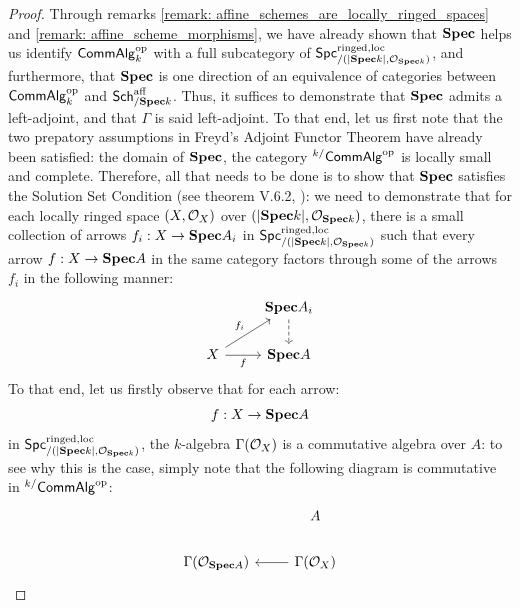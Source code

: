                     \begin{proof}
                        Through remarks \ref{remark: affine_schemes_are_locally_ringed_spaces} and \ref{remark: affine_scheme_morphisms}, we have already shown that $\Spec$ helps us identify $\Comm\Alg^{\op}_k$ with a full subcategory of $\Spc^{\ringed, \loc}_{/(|\Spec k|, \calO_{\Spec k})}$, and furthermore, that $\Spec$ is one direction of an equivalence of categories between $\Comm\Alg^{\op}_k$ and $\Sch^{\aff}_{/\Spec k}$. Thus, it suffices to demonstrate that $\Spec$ admits a left-adjoint, and that $\Gamma$ is said left-adjoint. To that end, let us first note that the two prepatory assumptions in Freyd's Adjoint Functor Theorem have already been satisfied: the domain of $\Spec$, the category ${}^{k/}\Comm\Alg^{\op}$ is locally small and complete. Therefore, all that needs to be done is to show that $\Spec$ satisfies the Solution Set Condition (see theorem V.6.2, \cite{maclane}): we need to demonstrate that for each locally ringed space $(X, \calO_X)$ over $(|\Spec k|, \calO_{\Spec k})$, there is a small collection of arrows $f_i: X \to \Spec A_i$ in $\Spc^{\ringed, \loc}_{/(|\Spec k|, \calO_{\Spec k})}$ such that every arrow $f: X \to \Spec A$ in the same category factors through some of the arrows $f_i$ in the following manner:
                            $$
                                \begin{tikzcd}
                                	& {\Spec A_i} \\
                                	X & {\Spec A}
                                	\arrow["f"', from=2-1, to=2-2]
                                	\arrow["{f_i}", from=2-1, to=1-2]
                                	\arrow[dashed, from=1-2, to=2-2]
                                \end{tikzcd}
                            $$
                        To that end, let us firstly observe that for each arrow:
                            $$f: X \to \Spec A$$
                        in $\Spc^{\ringed, \loc}_{/(|\Spec k|, \calO_{\Spec k})}$, the $k$-algebra $\Gamma(\calO_X)$ is a commutative algebra over $A$: to see why this is the case, simply note that the following diagram is commutative in ${}^{k/}\Comm\Alg^{\op}$:
                            $$
                                \begin{tikzcd}
                                	& A \\
                                	{\Gamma(\calO_{\Spec A})} & {\Gamma(\calO_X)}
                                	\arrow[from=2-2, to=2-1]

\end{tikzcd}$$
\end{proof}
